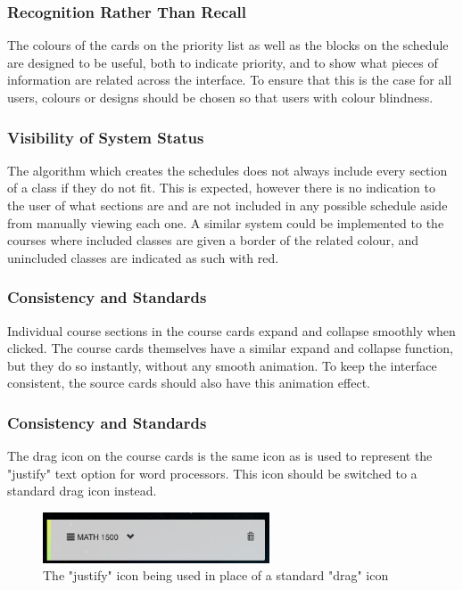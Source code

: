 \documentclass{article}
\begin{document}
\subsubsection{Recognition Rather Than Recall}
The colours of the cards on the priority list as well as the blocks on the schedule are designed to be useful, both to indicate priority, and to show what pieces of information are related across the interface. To ensure that this is the case for all users, colours or designs should be chosen so that users with colour blindness.



\subsubsection{Visibility of System Status}
The algorithm which creates the schedules does not always include every section of a class if they do not fit. This is expected, however there is no indication to the user of what sections are and are not included in any possible schedule aside from manually viewing each one. A similar system could be implemented to the courses where included classes are given a border of the related colour, and unincluded classes are indicated as such with red. 



\subsubsection{Consistency and Standards}
Individual course sections in the course cards expand and collapse smoothly when clicked. The course cards themselves have a similar expand and collapse function, but they do so instantly, without any smooth animation. To keep the interface consistent, the source cards should also have this animation effect.


\subsubsection{Consistency and Standards}
The drag icon on the course cards is the same icon as is used to represent the "justify" text option for word processors. This icon should be switched to a standard drag icon instead.

\begin{figure}[h!]
    \centering
    \includegraphics[width=0.6\textwidth]{dragicon.png}
    \caption{The "justify" icon being used in place of a standard "drag" icon}
    \label{fig:dragicon}
\end{figure}
\end{document}
